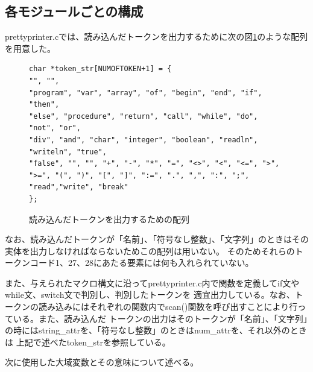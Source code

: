 \documentclass{jarticle}
\begin{document}
\subsection{各モジュールごとの構成}
prettyprinter.cでは、読み込んだトークンを出力するために次の図\ref{code:token}のような配列を用意した。
\begin{figure}[H]
\begin{center}
\begin{lstlisting}
char *token_str[NUMOFTOKEN+1] = {
"", "",
"program", "var", "array", "of", "begin", "end", "if", "then",
"else", "procedure", "return", "call", "while", "do", "not", "or",
"div", "and", "char", "integer", "boolean", "readln", "writeln", "true",
"false", "", "", "+", "-", "*", "=", "<>", "<", "<=", ">",
">=", "(", ")", "[", "]", ":=", ".", ",", ":", ";", "read","write", "break"
};
\end{lstlisting}
\caption{読み込んだトークンを出力するための配列}
\label{code:token}
\end{center}
\end{figure}
なお、読み込んだトークンが「名前」、「符号なし整数」、「文字列」のときはその実体を出力しなければならないためこの配列は用いない。
そのためそれらのトークンコード1、27、28にあたる要素には何も入れられていない。

また、与えられたマクロ構文に沿ってprettyprinter.c内で関数を定義してif文やwhile文、switch文で判別し、判別したトークンを
適宜出力している。なお、トークンの読み込みにはそれぞれの関数内でscan()関数を呼び出すことにより行っている。また、読み込んだ
トークンの出力はそのトークンが「名前」、「文字列」の時にはstring\_attrを、「符号なし整数」のときはnum\_attrを、それ以外のときは
上記で述べたtoken\_strを参照している。

次に使用した大域変数とその意味について述べる。
\end{document}
